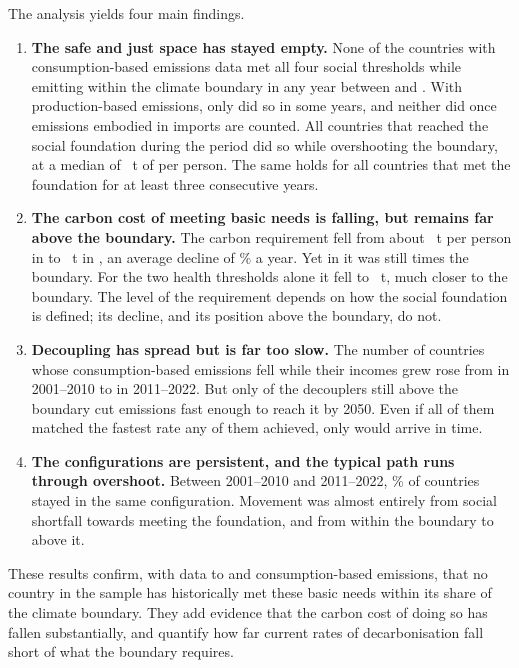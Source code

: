 The analysis yields four main findings.
\begin{enumerate}[label=(\roman*)]
\item \textbf{The safe and just space has stayed empty.} None of the \nNCons{} countries with consumption-based emissions data met all four social thresholds while emitting within the climate boundary in any year between \nFirstYear{} and \nLastYear. With production-based emissions, only \nProdSafeCountriesAll{} did so in some years, and neither did once emissions embodied in imports are counted. All \nNCrossers{} countries that reached the social foundation during the period did so while overshooting the boundary, at a median of \nCrossCarbonMedian~t of \COtwo{} per person. The same holds for all \nNCrossersSust{} countries that met the foundation for at least three consecutive years.
\item \textbf{The carbon cost of meeting basic needs is falling, but remains far above the boundary.} The carbon requirement fell from about \nReqStart~t per person in \nShareYearStart{} to \nReqEnd~t in \nLastYear, an average decline of \nReqTrend\% a year. Yet in \nLastYear{} it was still \nReqEndMultiple{} times the boundary. For the two health thresholds alone it fell to \nReqHealthEnd~t, much closer to the boundary. The level of the requirement depends on how the social foundation is defined; its decline, and its position above the boundary, do not.
\item \textbf{Decoupling has spread but is far too slow.} The number of countries whose consumption-based emissions fell while their incomes grew rose from \nDecAbsEarly{} in 2001--2010 to \nDecAbsLate{} in 2011--2022. But only \nDecAboveOnTrack{} of the \nDecAbsAbove{} decouplers still above the boundary cut emissions fast enough to reach it by 2050. Even if all of them matched the fastest rate any of them achieved, only \nScenFastest{} would arrive in time.
\item \textbf{The configurations are persistent, and the typical path runs through overshoot.} Between 2001--2010 and 2011--2022, \nPersistTwo\% of countries stayed in the same configuration. Movement was almost entirely from social shortfall towards meeting the foundation, and from within the boundary to above it.
\end{enumerate}

These results confirm, with data to \nLastYear{} and consumption-based emissions, that no country in the sample has historically met these basic needs within its share of the climate boundary. They add evidence that the carbon cost of doing so has fallen substantially, and quantify how far current rates of decarbonisation fall short of what the boundary requires.

